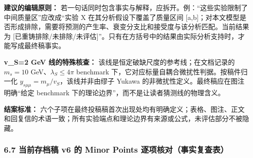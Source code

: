 \documentclass[
  chinese,
  UTF8]{ctexart}
\begin{document}
\textbf{建议的编辑原则：}
若一句话同时包含事实与解释，应拆开。例：``这些实验限制了中间质量区''应改成``实验
X 在其分析假设下覆盖了质量区间
{[}a,b{]}；对本文模型是否形成排除，需要将预测的产生率、衰变分支比和接受度与该分析匹配。当前结果为
{[}已重铸排除/未排除/未评估{]}''。只有在方括号中的结果由实际分析支持时，才能写成最终稿事实。

\textbf{v\_S=2 GeV 线的特殊核查：}
该线是恒定破缺尺度的参考线；在文档记录的 \(m_s=10\)
GeV、\(\lambda_S\le4\pi\) benchmark
下，它对应标量自耦合微扰性判据。按稿件归一化
\(y_{s\mu\mu}=m_\mu/v_S\)，该线并非由缪子 Yukawa
的非微扰性定义。最终稿应在图注明确``给定 benchmark
下的理论边界''，而不是让读者猜测线的物理含义。

\textbf{结案标准：}
六个子项在最终投稿稿首次出现处均有明确定义；表格、图注、正文和回复信的术语一致；所有实验端点和理论边界有来源或公式，未评估部分不被隐藏。

\subsubsection{6.7 当前存档稿 v6 的 Minor Points
逐项核对（事实复查表）}\label{ux5f53ux524dux5b58ux6863ux7a3f-v6-ux7684-minor-points-ux9010ux9879ux6838ux5bf9ux4e8bux5b9eux590dux67e5ux8868}
\end{document}
